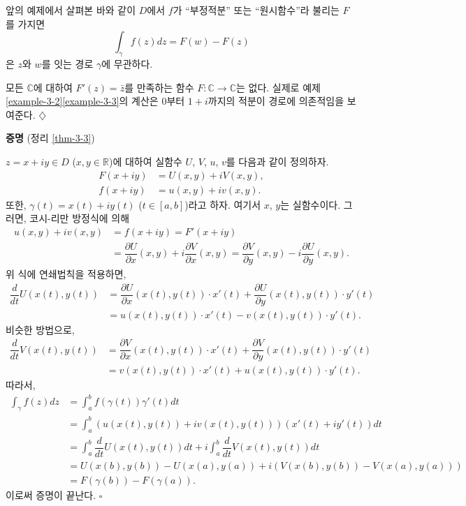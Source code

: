 앞의 예제에서 살펴본 바와 같이 
$D$에서 $f$가 ``부정적분'' 또는 ``원시함수''라 불리는 $F$를 가지면
\[
\int_\gamma f(z)dz = F(w) - F(z)
\]
은 $z$와 $w$를 잇는 경로 $\gamma$에 무관하다.

\begin{saltexample}[label=example-3-6]{}{}
모든 $\mathbb C$에 대하여 
$F'(z) = \bar z$를 만족하는 함수 $F:\mathbb C \to \mathbb C$는 없다.
실제로 예제 \ref{example-3-2}\와 \ref{example-3-3}의 계산은
$0$부터 $1+i$까지의 적분이 경로에 의존적임을 보여준다.
\hfill $\diamondsuit$
\end{saltexample}

{\bf 증명} (정리 \ref{thm-3-3})

$z = x+iy\in D$ ($x,y\in \mathbb R$)에 대하여
실함수 $U$, $V$, $u$, $v$를 다음과 같이 정의하자.
\begin{align*}
F(x+iy) &= U(x,y) + iV(x,y), \\
f(x+iy) &= u(x,y) + iv(x,y).
\end{align*}
또한, $\gamma(t) = x(t) + iy(t)$ ($t\in[a,b]$)라고 하자.
여기서 $x$, $y$는 실함수이다.
그러면, 코시-리만 방정식에 의해
\begin{align*}
u(x,y) + iv(x,y) 
&= f(x+iy) = F'(x+iy) \\
&= \dfrac{\partial U}{\partial x}(x,y) + i \dfrac{\partial V}{\partial x}(x,y)
= \dfrac{\partial V}{\partial y}(x,y) - i \dfrac{\partial U}{\partial y}(x,y).
\end{align*}
위 식에 연쇄법칙을 적용하면,
\begin{align*}
\dfrac d{dt} U(x(t), y(t))
&= \dfrac{\partial U}{\partial x}(x(t),y(t))\cdot x'(t)
 + \dfrac{\partial U}{\partial y}(x(t),y(t))\cdot y'(t) \\
&= u(x(t),y(t))\cdot x'(t) - v(x(t),y(t))\cdot y'(t).
\end{align*}
비슷한 방법으로,
\begin{align*}
\dfrac d{dt} V(x(t), y(t))
&= \dfrac{\partial V}{\partial x}(x(t),y(t))\cdot x'(t)
 + \dfrac{\partial V}{\partial y}(x(t),y(t))\cdot y'(t) \\
&= v(x(t),y(t))\cdot x'(t) + u(x(t),y(t))\cdot y'(t).
\end{align*}
따라서,
\begin{align*}
\int_\gamma f(z)dz
&= \int_a^b f(\gamma(t))\gamma'(t)dt \\
&= \int_a^b \left( u(x(t), y(t)) + iv(x(t),y(t)) \right) (x'(t)+iy'(t))dt \\
&= \int_a^b \dfrac d{dt} U(x(t), y(t))dt + i \int_a^b \dfrac d{dt} V(x(t), y(t))dt \\
&= U(x(b), y(b)) - U(x(a), y(a)) + 
i\left( V(x(b), y(b)) - V(x(a), y(a)) \right) \\
&= F(\gamma(b)) - F(\gamma(a)).
\end{align*}
이로써 증명이 끝난다. \hfill $\square$

